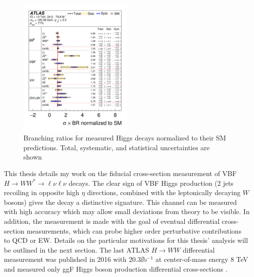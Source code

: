\begin{figure}[H]
        \centering
    \includegraphics[width=0.5\textwidth] {Pictures/branchingratio.png}\hspace{1cm}
    \caption{Branching ratios for measured Higgs decays normalized to their SM predictions. Total, systematic, and statistical uncertainties are shown \cite{HiggsCurrent}}
    \label{fig:branchingratio}
\end{figure}
This thesis details my work on the fiducial cross-section measurement of VBF $H\rightarrow WW^*\rightarrow\ell\nu\ell\nu$ decays. The clear sign of VBF Higgs production (2 jets recoiling in opposite high $\eta$ directions, combined with the leptonically decaying $W$ bosons) gives the decay a distinctive signature. This channel can be measured with high accuracy which may allow small deviations from theory to be visible. In addition, the measurement is made with the goal of eventual differential cross-section measurements, which can probe higher order perturbative contributions to QCD or EW. Details on the particular motivations for this thesis' analysis will be outlined in the next section. The last ATLAS $H\rightarrow WW$ differential measurement was published in 2016 with 20.3fb$^{-1}$ at center-of-mass energy 8 TeV and measured only ggF Higgs boson production differential cross-sections \cite{HiggsDifferential}. 


